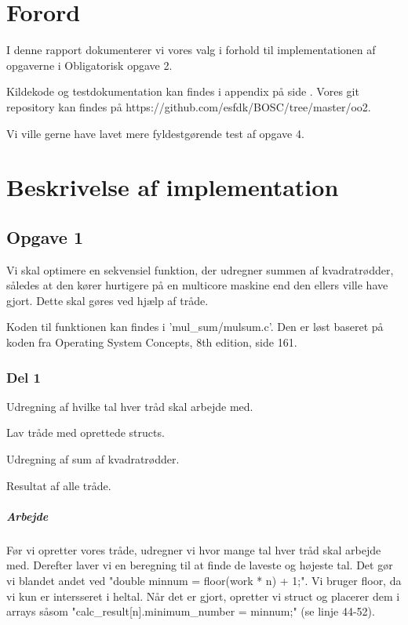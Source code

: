 \chapter{Forord}
I denne rapport dokumenterer vi vores valg i forhold til implementationen af opgaverne i Obligatorisk opgave 2.

Kildekode og testdokumentation kan findes i appendix på side \pageref{Appendix}. Vores git repository kan findes på https://github.com/esfdk/BOSC/tree/master/oo2.

Vi ville gerne have lavet mere fyldestgørende test af opgave 4.

\chapter{Beskrivelse af implementation}
\section{Opgave 1}
\label{O1}
Vi skal optimere en sekvensiel funktion, der udregner summen af kvadratrødder, således at den kører hurtigere på en multicore maskine end den ellers ville have gjort. Dette skal gøres ved hjælp af tråde.

Koden til funktionen kan findes i 'mul\_sum/mulsum.c'. Den er løst baseret på koden fra Operating System Concepts, 8th edition, side 161.

\subsection{Del 1}
\label{O1_1}
\begin{my_itemize}
\item Udregning af hvilke tal hver tråd skal arbejde med.
\item Lav tråde med oprettede structs.
\item Udregning af sum af kvadratrødder.
\item Resultat af alle tråde.
\end{my_itemize}
\paragraph{Arbejde} Før vi opretter vores tråde, udregner vi hvor mange tal hver tråd skal arbejde med. Derefter laver vi en beregning til at finde de laveste og højeste tal. Det gør vi blandet andet ved "double minnum = floor(work * n) + 1;". Vi bruger floor, da vi kun er intersseret i heltal. Når det er gjort, opretter vi struct og placerer dem i arrays såsom "calc\_result[n].minimum\_number = minnum;" (se linje 44-52). 
